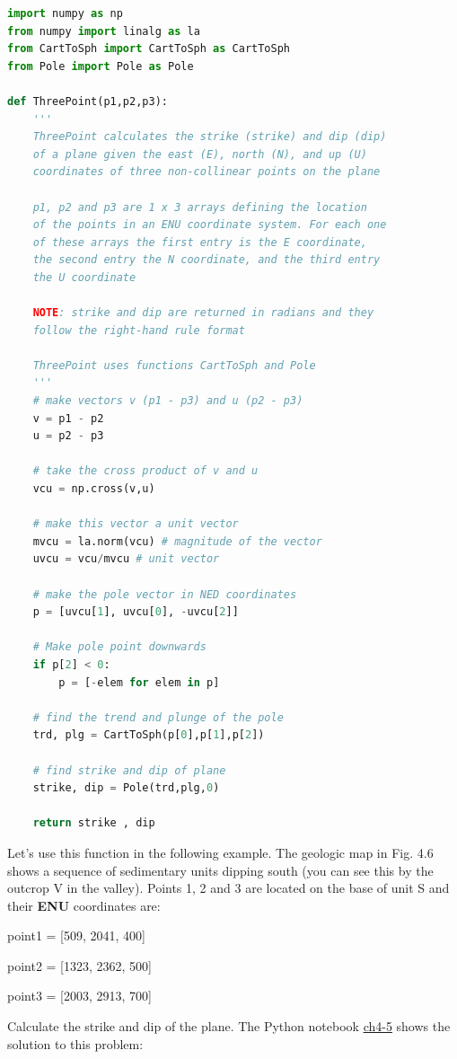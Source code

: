 \documentclass[a4paper , 12pt]{book}
\begin{document}
\begin{lstlisting}[language=Python, frame=single]
import numpy as np
from numpy import linalg as la
from CartToSph import CartToSph as CartToSph
from Pole import Pole as Pole

def ThreePoint(p1,p2,p3):
    '''
    ThreePoint calculates the strike (strike) and dip (dip) 
    of a plane given the east (E), north (N), and up (U) 
    coordinates of three non-collinear points on the plane
    
    p1, p2 and p3 are 1 x 3 arrays defining the location 
    of the points in an ENU coordinate system. For each one 
    of these arrays the first entry is the E coordinate, 
    the second entry the N coordinate, and the third entry 
    the U coordinate

    NOTE: strike and dip are returned in radians and they 
    follow the right-hand rule format

    ThreePoint uses functions CartToSph and Pole
    '''
    # make vectors v (p1 - p3) and u (p2 - p3)
    v = p1 - p2
    u = p2 - p3
    
    # take the cross product of v and u
    vcu = np.cross(v,u)
    
    # make this vector a unit vector
    mvcu = la.norm(vcu) # magnitude of the vector
    uvcu = vcu/mvcu # unit vector
    
    # make the pole vector in NED coordinates
    p = [uvcu[1], uvcu[0], -uvcu[2]]

    # Make pole point downwards
    if p[2] < 0:
        p = [-elem for elem in p]
        
    # find the trend and plunge of the pole
    trd, plg = CartToSph(p[0],p[1],p[2])
    
    # find strike and dip of plane
    strike, dip = Pole(trd,plg,0)
    
    return strike , dip
\end{lstlisting}

Let's use this function in the following example. The geologic map in Fig. 4.6 shows a sequence of sedimentary units dipping south (you can see this by the outcrop V in the valley). Points 1, 2 and 3 are located on the base of unit S and their \textbf{ENU} coordinates are: 

point1 = [509, 2041, 400]

point2 = [1323, 2362, 500]

point3 = [2003, 2913, 700] 

Calculate the strike and dip of the plane. The Python notebook \href{https://github.com/nfcd/compGeo/blob/master/source/notebooks/ch4-5.ipynb}{ch4-5} shows the solution to this problem:\\ 
\end{document}
